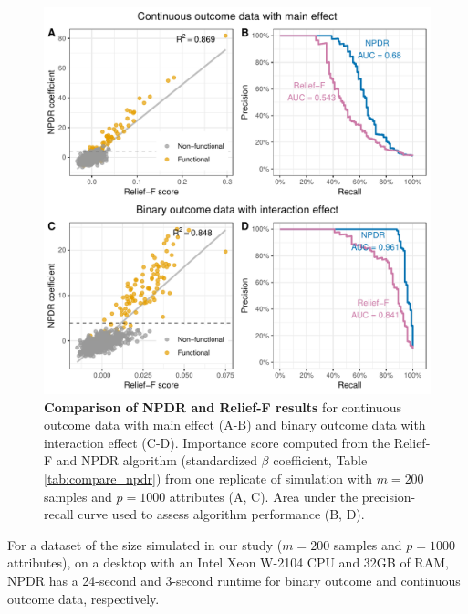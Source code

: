 \documentclass[10pt]{article}
\begin{document}
\begin{figure}[!tbp]
\centerline{\includegraphics[trim = 0 0 0 0]{../figs/fig1.pdf}}
\caption{{\bf Comparison of NPDR and Relief-F results} for continuous outcome data with main effect (A-B) and binary outcome data with interaction effect (C-D). Importance score computed from the Relief-F and NPDR algorithm (standardized $\beta$ coefficient, Table \ref{tab:compare_npdr}) from one replicate of simulation with $m = 200$ samples and $p = 1000$ attributes (A, C). Area under the precision-recall curve used to assess algorithm performance (B, D).}
\label{fig:npdr_relief}
\end{figure}

For a dataset of the size simulated in our study ($m=200$ samples and $p=1000$ attributes), on a desktop with an Intel Xeon W-2104 CPU and 32GB of RAM, NPDR has a 24-second and 3-second runtime for binary outcome and continuous outcome data, respectively.

\end{document}

